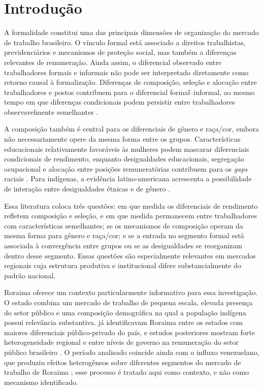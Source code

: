 \documentclass[12pt,a4paper]{article}
\begin{document}
\newpage

\section{Introdução}
\label{sec:introducao}

A formalidade constitui uma das principais dimensões de organização do mercado de trabalho 
brasileiro. O vínculo formal está associado a direitos trabalhistas, previdenciários e 
mecanismos de proteção social, mas também a diferenças relevantes de remuneração. Ainda 
assim, o diferencial observado entre trabalhadores formais e informais não pode ser 
interpretado diretamente como retorno causal à formalização. Diferenças de composição, 
seleção e alocação entre trabalhadores e postos contribuem para o diferencial formal–informal, 
ao mesmo tempo em que diferenças condicionais podem persistir entre trabalhadores 
observavelmente semelhantes \citep{ulyssea2006, curi2006, meghir2015, ulyssea2018}.

A composição também é central para os diferenciais de gênero e raça/cor, embora não 
necessariamente opere da mesma forma entre os grupos. Características educacionais 
relativamente favoráveis às mulheres podem mascarar diferenciais condicionais de 
rendimento, enquanto desigualdades educacionais, segregação ocupacional e alocação 
entre posições remuneratórias contribuem para os \textit{gaps} raciais 
\citep{giuberti2005, soares2000, campante2004, gerard2021}. Para indígenas, a 
evidência latino-americana acrescenta a possibilidade de interação entre desigualdades 
étnicas e de gênero \citep{kolev2015}.

Essa literatura coloca três questões: em que medida os diferenciais de rendimento
refletem composição e seleção, e em que medida permanecem entre trabalhadores com
características semelhantes; se os mecanismos de composição operam da mesma forma para
gênero e raça/cor; e se a entrada no segmento formal está associada à convergência entre
grupos ou se as desigualdades se reorganizam dentro desse segmento. Essas questões são
especialmente relevantes em mercados regionais cuja estrutura produtiva e institucional
difere substancialmente do padrão nacional.

Roraima oferece um contexto particularmente informativo para essa investigação. O estado
combina um mercado de trabalho de pequena escala, elevada presença do setor público e
uma composição demográfica na qual a população indígena possui relevância substantiva.
\citet{moriconi2009} já identificavam Roraima entre os estados com maiores diferenciais
público-privado do país, e estudos posteriores mostram forte heterogeneidade regional e
entre níveis de governo na remuneração do setor público brasileiro
\citep{mattos2022, baez2021}. O período analisado coincide ainda com o influxo
venezuelano, que produziu efeitos heterogêneos sobre diferentes segmentos do mercado de
trabalho de Roraima \citep{ryu2022, santanna2024}; esse processo é tratado aqui como
contexto, e não como mecanismo identificado.
\end{document}
